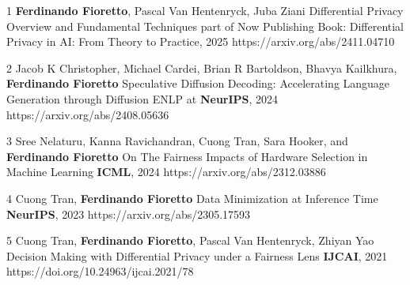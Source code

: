 \documentclass[localFont,alternative]{metadataShortBio}
\begin{document}
{
\begin{pubs}
	



	\confentryShort
	{1}
	{{\bf Ferdinando Fioretto}, Pascal Van Hentenryck, Juba Ziani}
	{Differential Privacy Overview and Fundamental Techniques}
  {part of Now Publishing Book: Differential Privacy in AI: From Theory to Practice, 2025}
	{https://arxiv.org/abs/2411.04710}

	\confentryShort
	{2}
	{Jacob K Christopher, Michael Cardei, Brian R Bartoldson, Bhavya Kailkhura, {\bf Ferdinando Fioretto}}
	{Speculative Diffusion Decoding: Accelerating Language Generation through Diffusion}
	{ENLP at {\textbf{NeurIPS}, 2024}}
	{https://arxiv.org/abs/2408.05636}

	\confentryShort
  {3} %
	{Sree Nelaturu, Kanna Ravichandran, Cuong Tran, Sara Hooker, and {\bf Ferdinando Fioretto}}
	{On The Fairness Impacts of Hardware Selection in Machine Learning}
  {\textbf{ICML}, 2024}
	{https://arxiv.org/abs/2312.03886}

	\confentryShort
	{4}
	{{Cuong Tran}, {\bf Ferdinando Fioretto}}
	{Data Minimization at Inference Time}
	{\textbf{NeurIPS}, 2023}
	{https://arxiv.org/abs/2305.17593}


	\confentryShort
	{5}
	{Cuong Tran, {\bf Ferdinando Fioretto}, Pascal Van Hentenryck, Zhiyan Yao}
  {Decision Making with Differential Privacy under a Fairness Lens}
  {\textbf{IJCAI}, 2021}
  {https://doi.org/10.24963/ijcai.2021/78}


\end{pubs}}
\end{document}
